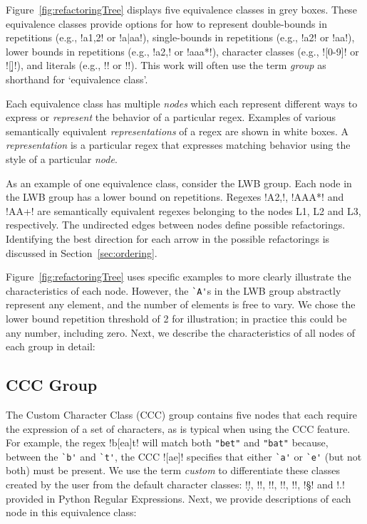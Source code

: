 Figure~\ref{fig:refactoringTree} displays five equivalence classes in grey boxes.  These equivalence classes provide options for how to represent double-bounds in repetitions (e.g., \cverb!a{1,2}! or \cverb!a|aa!), single-bounds in repetitions (e.g., \cverb!a{2}! or \cverb!aa!), lower bounds in repetitions (e.g., \cverb!a{2,}! or \cverb!aaa*!), character classes (e.g., \cverb![0-9]! or \cverb![\d]!), and literals (e.g., \cverb!\a! or \cverb!!).  This work will often use the term \emph{group} as shorthand for `equivalence class'.

Each equivalence class has multiple \emph{nodes} which each represent different ways to express or \emph{represent} the behavior of a particular regex.  Examples of various semantically equivalent \emph{representations} of a regex are shown in white boxes. A \emph{representation} is a particular regex that expresses matching behavior using the style of a particular \emph{node}.

As an example of one equivalence class, consider the LWB group.  Each node in the LWB group has a lower bound on repetitions. Regexes \cverb!A{2,}!, \cverb!AAA*! and \cverb!AA+! are semantically equivalent regexes belonging to the nodes L1, L2 and L3, respectively.
The undirected edges between nodes define possible refactorings.
Identifying the best direction for each arrow in the possible refactorings is discussed in Section~\ref{sec:ordering}.

Figure~\ref{fig:refactoringTree} uses specific examples to more clearly illustrate the characteristics of each node.  However, the \verb!`A'!s in the LWB group abstractly represent any element, and the number of elements is free to vary. We chose the lower bound repetition threshold of 2 for illustration; in practice this could be any number, including zero.
Next, we describe the characteristics of all nodes of each group in detail:

\subsection{CCC Group}
The Custom Character Class (CCC) group contains five nodes that each require the expression of a set of characters, as is typical when using the CCC feature.  For example, the regex \cverb!b[ea]t! will match both \verb!"bet"! and \verb!"bat"! because, between the \verb!`b'! and \verb!`t'!, the CCC \cverb![ae]! specifies that either \verb!`a'! or \verb!`e'! (but not both) must be present.
We use the term \emph{custom} to differentiate these classes created by the user from the default character classes: \cverb!\d!, \cverb!\D!, \cverb!\w!, \cverb!\W!, \cverb!\s!, \cverb!\S! and \cverb!.! provided in Python Regular Expressions.
Next, we provide descriptions of each node in this equivalence class:

